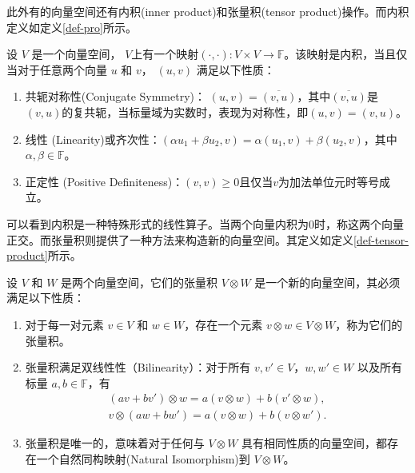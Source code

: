 此外有的向量空间还有内积(inner product)和张量积(tensor product)操作。而内积定义如定义\ref{def-pro}所示。
\begin{definition}\citep{greub2012linear}
    \label{def-pro}
    设 \(V\) 是一个向量空间，
    \(V\)上有一个映射\(( \cdot, \cdot ): V \times V \rightarrow \mathbb{F}\)。该映射是内积，当且仅当对于任意两个向量 $u$ 和 $v$， $( u, v )$ 满足以下性质：
\begin{enumerate}
    \item 共轭对称性(Conjugate Symmetry)： \(( u, v ) = \overline{( v, u )}\)，其中\(\overline{( v, u )}\)是\(( v, u )\)的复共轭，当标量域为实数时，表现为对称性，即\(( u, v ) = ( v, u )\)。
    \item 线性 (Linearity)或齐次性：\(( \alpha u_1 + \beta u_2, v ) = \alpha( u_1, v ) + \beta( u_2, v )\)，其中\(\alpha,\beta\in\mathbb{F}\)。
    \item 正定性 (Positive Definiteness)：\(( v, v ) \geq 0\)且仅当\(v \)为加法单位元时等号成立。
\end{enumerate}
\end{definition}
可以看到内积是一种特殊形式的线性算子。当两个向量内积为$0$时，称这两个向量正交。而张量积则提供了一种方法来构造新的向量空间。其定义如定义\ref{def-tensor-product}所示。
\begin{definition}\citep{greub2012linear}
    \label{def-tensor-product}
    设 \(V\) 和 \(W\) 是两个向量空间，它们的张量积 \(V \otimes W\) 是一个新的向量空间，其必须满足以下性质：
\begin{enumerate}
    \item 对于每一对元素 \(v \in V\) 和 \(w \in W\)，存在一个元素 \(v \otimes w \in V \otimes W\)，称为它们的张量积。
    \item 张量积满足双线性性（Bilinearity）：对于所有 \(v,v' \in V\)，\(w,w' \in W\) 以及所有标量 \(a,b \in \mathbb{F}\)，有
    \begin{align}
    (av + bv') \otimes w = a(v \otimes w) + b(v' \otimes w),\\
    v \otimes (aw + bw') = a(v \otimes w) + b(v \otimes w').
    \end{align}
    \item 张量积是唯一的，意味着对于任何与 \(V \otimes W\) 具有相同性质的向量空间，都存在一个自然同构映射(Natural Isomorphism)到 \(V \otimes W\)。
\end{enumerate}
\end{definition}



